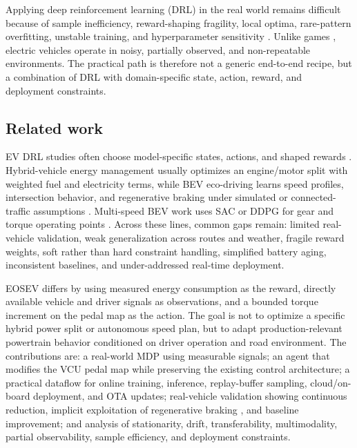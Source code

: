 \documentclass[conference]{IEEEtran}
\begin{document}
Applying deep reinforcement learning (DRL) in the real world remains difficult because of sample inefficiency, reward-shaping fragility, local optima, rare-pattern overfitting, unstable training, and hyperparameter sensitivity \parencite{DulacArnold_2021_real_world_rl}. Unlike games \parencite{mnih13:_playin_atari_deep_reinf_learn,DBLP:journals/nature/SilverHMGSDSAPL16,DBLP:conf/ijcai/BrownS17,openai19:_dota_large_scale_deep_reinf_learn,bakhtin22:_Human_level_diplomacy_cicero}, electric vehicles operate in noisy, partially observed, and non-repeatable environments. The practical path is therefore not a generic end-to-end recipe, but a combination of DRL with domain-specific state, action, reward, and deployment constraints.

\subsection{Related work}\label{sec:related}

EV DRL studies often choose model-specific states, actions, and shaped rewards \parencite{Egan_2023,Wang_2020,Hou_2022,Hu_2018}. Hybrid-vehicle energy management usually optimizes an engine/motor split with weighted fuel and electricity terms, while BEV eco-driving learns speed profiles, intersection behavior, and regenerative braking under simulated or connected-traffic assumptions \parencite{yeom2022mpc_drl_bev_ecodriving,li2023drl_ecodriving_traffic_uncertainties,zhang2022adaptive_ev_ecodriving}. Multi-speed BEV work uses SAC or DDPG for gear and torque operating points \parencite{yang2025drl_multispeed_pev_ems}. Across these lines, common gaps remain: limited real-vehicle validation, weak generalization across routes and weather, fragile reward weights, soft rather than hard constraint handling, simplified battery aging, inconsistent baselines, and under-addressed real-time deployment.

EOSEV differs by using measured energy consumption as the reward, directly available vehicle and driver signals as observations, and a bounded torque increment on the pedal map as the action. The goal is not to optimize a specific hybrid power split or autonomous speed plan, but to adapt production-relevant powertrain behavior conditioned on driver operation and road environment. The contributions are: a real-world MDP using measurable signals; an agent that modifies the VCU pedal map while preserving the existing control architecture; a practical dataflow for online training, inference, replay-buffer sampling, cloud/on-board deployment, and OTA updates; real-vehicle validation showing continuous reduction, implicit exploitation of regenerative braking \parencite{Yang_2024_RBS}, and baseline improvement; and analysis of stationarity, drift, transferability, multimodality, partial observability, sample efficiency, and deployment constraints.
\end{document}
